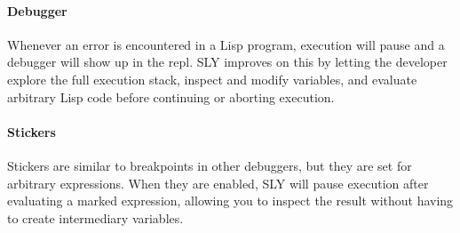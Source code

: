 \paragraph{Debugger}

Whenever an error is encountered in a Lisp program,
execution will pause and a debugger will show up in the \ac{repl}.
SLY improves on this by letting the developer explore the full execution stack,
inspect and modify variables,
and evaluate arbitrary Lisp code before continuing or aborting execution.

\paragraph{Stickers}

Stickers are similar to breakpoints in other debuggers,
but they are set for arbitrary expressions.
When they are enabled,
SLY will pause execution after evaluating a marked expression,
allowing you to inspect the result without having to create intermediary variables.
